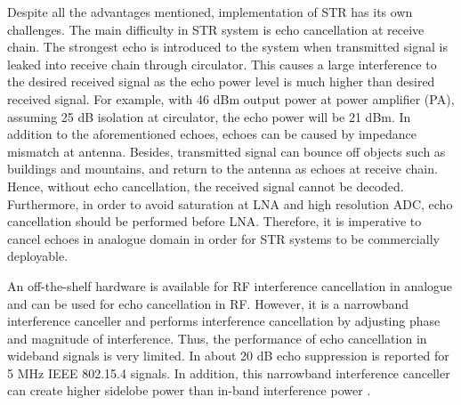 \documentclass[twocolumn]{IEEEtran}
\begin{document}
Despite all the advantages mentioned, implementation of STR has its
own challenges. The main difficulty in STR system is echo
cancellation at receive chain. The strongest echo is introduced to
the system when transmitted signal is leaked into receive chain
through circulator. This causes a large interference to the desired
received signal as the echo power level is much higher than desired
received signal. For example, with 46 dBm output power at power
amplifier (PA), assuming 25 dB isolation at circulator, the echo
power will be 21 dBm. In addition to the aforementioned echoes,
echoes can be caused by impedance mismatch at antenna. Besides,
transmitted signal can bounce off objects such as buildings and
mountains, and return to the antenna as echoes at receive chain.
Hence, without echo cancellation, the received signal cannot be
decoded. Furthermore, in order to avoid saturation at LNA and high
resolution ADC, echo cancellation should be performed before LNA.
Therefore, it is imperative to cancel echoes in analogue domain in
order for STR systems to be commercially deployable.

An off-the-shelf hardware \cite{narrow} is available for RF
interference cancellation in analogue and can be used for echo
cancellation in RF. However, it is a narrowband interference
canceller and performs interference cancellation by adjusting phase
and magnitude of interference. Thus, the performance of echo
cancellation in wideband signals is very limited. In \cite{stanford}
about 20 dB echo suppression is reported for 5 MHz IEEE 802.15.4
signals. In addition, this narrowband interference canceller can
create higher sidelobe power than in-band interference power
\cite{stanford}.
\end{document}
